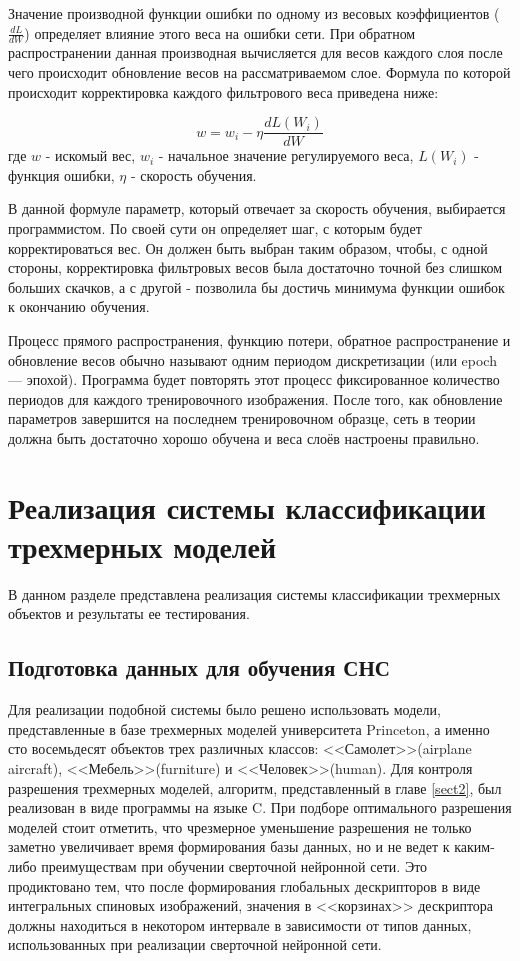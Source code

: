 \documentclass[14pt]{article}
\numberwithin{figure}{section}
\numberwithin{equation}{section}
\begin{document}
Значение производной функции ошибки по одному из весовых коэффициентов ($\frac{dL}{dW}$) определяет влияние этого веса на ошибки сети. При обратном распространении данная производная вычисляется для весов каждого слоя после чего происходит обновление весов на рассматриваемом слое. Формула по которой происходит корректировка каждого фильтрового веса приведена ниже:

\begin{equation}
    w = w_i - \eta\frac{dL(W_i)}{dW}
\end{equation}
где $w$ - искомый вес, $w_i$ - начальное значение регулируемого веса, $L(W_i)$ - функция ошибки, $\eta$ - скорость обучения.

В данной формуле параметр, который отвечает за скорость обучения, выбирается программистом. По своей сути он определяет шаг, с которым будет корректироваться вес. Он должен быть выбран таким образом, чтобы, с одной стороны, корректировка фильтровых весов была достаточно точной без слишком больших скачков, а с другой - позволила бы достичь минимума функции ошибок к окончанию обучения.

Процесс прямого распространения, функцию потери, обратное распространение и обновление весов обычно называют одним периодом дискретизации (или epoch — эпохой). Программа будет повторять этот процесс фиксированное количество периодов для каждого тренировочного изображения. После того, как обновление параметров завершится на последнем тренировочном образце, сеть в теории должна быть достаточно хорошо обучена и веса слоёв настроены правильно.

\newpage

\section{Реализация системы классификации трехмерных моделей}

В данном разделе представлена реализация системы классификации трехмерных объектов и результаты ее тестирования.

\subsection{Подготовка данных для обучения СНС}

Для реализации подобной системы было решено использовать модели, представленные в базе трехмерных моделей университета Princeton, а именно сто восемьдесят объектов трех различных классов: <<Самолет>>(airplane aircraft), <<Мебель>>(furniture) и <<Человек>>(human). Для контроля разрешения трехмерных моделей, алгоритм, представленный в главе \ref{sect2}, был реализован в виде программы на языке C. При подборе оптимального разрешения моделей стоит отметить, что чрезмерное уменьшение разрешения не только заметно увеличивает время формирования базы данных, но и не ведет к каким-либо преимуществам при обучении сверточной нейронной сети. Это продиктовано тем, что после формирования глобальных дескрипторов в виде интегральных спиновых изображений, значения в <<корзинах>> дескриптора должны находиться в некотором интервале в зависимости от типов данных, использованных при реализации сверточной нейронной сети.
\end{document}
